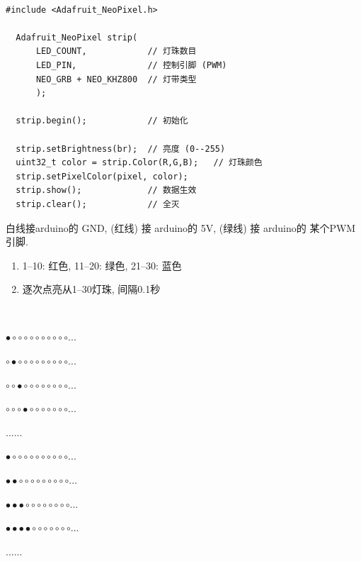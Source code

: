 \documentclass[a4paper,11pt]{seminar}
\begin{document}
~\ \vskip-6mm
\begin{lstlisting}[morekeywords={uint32_t}]
#include <Adafruit_NeoPixel.h>

  Adafruit_NeoPixel strip(
      LED_COUNT,            // 灯珠数目
      LED_PIN,              // 控制引脚 (PWM)
      NEO_GRB + NEO_KHZ800  // 灯带类型
      );

  strip.begin();            // 初始化

  strip.setBrightness(br);  // 亮度 (0--255)
  uint32_t color = strip.Color(R,G,B);   // 灯珠颜色
  strip.setPixelColor(pixel, color);
  strip.show();             // 数据生效
  strip.clear();            // 全灭
\end{lstlisting}
\endslide


白线接arduino的 GND, \colorbox{red}{\color{blue}{+5V}} (红线) 接
arduino的 5V, \colorbox{green}{\color{black}{Di}} (绿线)
接 arduino的 某个PWM引脚.
\begin{enumerate}
    \item 1--10: 红色, 11--20: 绿色, 21--30: 蓝色
    \item 逐次点亮从1--30灯珠, 间隔0.1秒
\end{enumerate}

\begin{minipage}[t]{0.1\textwidth}
~~~~
\end{minipage}
\begin{minipage}[t]{.4\textwidth}
    \fontsize{12}{12}\selectfont\color{red}
$\bullet\circ\circ\circ\circ\circ\circ\circ\circ\circ\circ...$

$\circ\bullet\circ\circ\circ\circ\circ\circ\circ\circ\circ...$

$\circ\circ\bullet\circ\circ\circ\circ\circ\circ\circ\circ...$

$\circ\circ\circ\bullet\circ\circ\circ\circ\circ\circ\circ...$

......
\end{minipage}
\begin{minipage}[t]{.4\textwidth}
    \fontsize{12}{12}\selectfont\color{red}
$\bullet\circ\circ\circ\circ\circ\circ\circ\circ\circ\circ...$

$\bullet\bullet\circ\circ\circ\circ\circ\circ\circ\circ\circ...$

$\bullet\bullet\bullet\circ\circ\circ\circ\circ\circ\circ\circ...$

$\bullet\bullet\bullet\bullet\circ\circ\circ\circ\circ\circ\circ...$

......
\end{minipage}
\endslide
\end{document}
